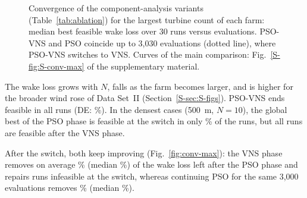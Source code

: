 \begin{figure}[!t]
\centering
{}
\caption{Convergence of the \NAblNVar{} component-analysis variants (Table~\ref{tab:ablation}) for the largest turbine count of each farm: median best feasible wake loss over 30 runs versus evaluations. PSO-VNS and PSO coincide up to 3,030 evaluations (dotted line), where PSO-VNS switches to VNS. Curves of the main comparison: Fig.~\ref{S-fig:S-conv-max} of the supplementary material.}
\label{fig:conv-max}
\label{fig:ablation}
\end{figure}

The wake loss grows with $N$, falls as the farm becomes larger, and is higher for the broader wind rose of Data Set~II (Section~\ref{S-sec:S-figs}). PSO-VNS ends feasible in all runs (DE: \NFeasDE\%). In the densest cases (500~m, $N=10$), the global best of the PSO phase is feasible at the switch in only \NDenseSwitchFeas\% of the runs, but all runs are feasible after the VNS phase.

After the switch, both keep improving (Fig.~\ref{fig:conv-max}): the VNS phase removes on average \NPhTwoMean\% (median \NPhTwoMedian\%) of the wake loss left after the PSO phase and repairs \NPhTwoMadeFeas{} runs infeasible at the switch, whereas continuing PSO for the same 3,000 evaluations removes \NPsoContMean\% (median \NPsoContMedian\%).
